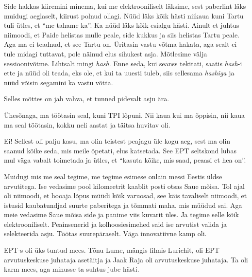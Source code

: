 Side hakkas kiiremini minema, kui me elektrooniliselt läksime, sest paberlint 
läks muidugi aeglaselt, kiirust polnud ollagi.  Nüüd läks kõik hästi niikaua 
kuni Tartu tuli ütles, et \enquote{me tahame ka}. Ka nüüd läks kõik esialgu 
hästi. Ainult et juhtus niimoodi, et Paide helistas mulle peale, side kukkus ja 
siis helistas Tartu peale. Aga ma ei teadnud, et see Tartu on. Üritasin vastu 
võtma hakata, aga sealt ei tule midagi tuttavat, pole näinud elus sihukest 
asja. Mõtlesime välja sessioonivõtme. Lihtsalt mingi \emph{hash}. Enne seda, 
kui seanss tekitati, saatis \emph{hash}-i ette ja nüüd oli teada, eks ole, et 
kui ta uuesti tuleb, siis sellesama \emph{hashiga} ja nüüd võisin segamini ka 
vastu võtta. 


Selles mõttes on jah vahva, et tunned pidevalt asju ära. 

Ühesõnaga, ma töötasin seal, kuni TPI lõpuni. Nii kaua kui ma õppisin, nii kaua 
ma seal töötasin, kokku neli aastat ja täitsa huvitav oli.


Ei! Sellest oli palju kasu, ma olin teistest peajagu üle kogu aeg, sest ma olin 
saanud kõike seda, mis meile õpetati, elus katsetada. See EPT seltskond lubas 
mul väga vabalt toimetada ja ütles, et \enquote{kasuta kõike, mis saad, peaasi 
et hea on}. 

Muidugi mis me seal tegime, me tegime esimese onlain messi Eestis üldse 
arvutitega. Ise vedasime pool kilomeetrit kaablit posti otsas Saue mõisa. Tol 
ajal oli niimoodi, et hooaja lõpus müüdi kõik varuosad, see käis tavaliselt 
niimoodi, et  istusid kaubatundjad suurte paberitega ja tõmmati maha, mis 
müüdud sai. Aga meie vedasime Saue mõisa side ja panime viis kuvarit üles. Ja 
tegime selle kõik elektrooniliselt. Peainsenerid ja kolhoosiesimehed said ise 
arvutist valida ja selekteerida asju. Töötas suurepäraselt. Väga innovatiivne 
kamp oli.


EPT-s oli üks tuntud mees. Tõnu Lume, mängis filmis 
Lurichit, 
oli EPT arvutuskeskuse juhataja asetäitja ja Jaak Raja 
oli arvutuskeskuse juhataja. Ta oli karm mees, aga minusse ta suhtus jube 
hästi. 

